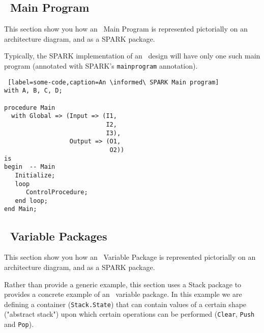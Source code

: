 \subsection{\informed\ Main Program}

\noindent\parbox[][][t]{.2\linewidth}{
    }%
 \parbox[][][t]{.8\linewidth}{
This section show you how an \informed\ Main Program is represented pictorially on an architecture
diagram, and as a SPARK package.

Typically, the SPARK implementation of an \informed\ design will have only one
such main program (annotated with SPARK's \texttt{main\textunderscore program} annotation).
}

\begin{lstlisting} [label=some-code,caption=An \informed\ SPARK Main program]
with A, B, C, D;

procedure Main
  with Global => (Input => (I1,
                            I2,
                            I3),
                  Output => (O1,
                             O2))
is
begin  -- Main
   Initialize;
   loop
      ControlProcedure;
   end loop;
end Main;
\end{lstlisting}


\subsection{\informed\ Variable Packages}

\noindent\parbox[][][t]{.2\linewidth}{
    }%
 \parbox[][][t]{.8\linewidth}{

This section show you how an \informed\ Variable Package is represented pictorially on an architecture
diagram, and as a SPARK package.}

Rather than provide a generic example, this section uses a Stack package to provides a concrete example of an
\informed\ variable package. In this example we are defining a container (\texttt{Stack.State}) that can contain
values of a certain shape ("abstract stack") upon which certain operations can be performed (\texttt{Clear},
\texttt{Push} and \texttt{Pop}).


